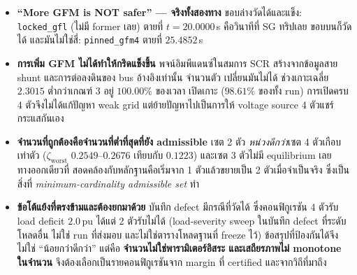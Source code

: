 \documentclass[11pt,a4paper]{article}
\newcommand{\pu}{\,\mathrm{pu}}
\newcommand{\code}[1]{\texttt{\small #1}}
\newcommand{\zworst}{\zeta_{\mathrm{worst}}}
\begin{document}
\begin{itemize}
\item \textbf{``More GFM is NOT safer'' — จริงทั้งสองทาง} ขอบล่างวัดได้และแข็ง:
      \code{locked\_gfl} (ไม่มี former เลย) ตายที่ $t = 20.0000$\,s คือวินาทีที่
      SG ทริปเลย ขอบบนก็วัดได้ และมันไม่ใช่สี่: \code{pinned\_gfm4} ตายที่
      $25.4852$\,s
\item \textbf{การเพิ่ม GFM ไม่ได้ทำให้กริดแข็งขึ้น} พจน์อิมพีแดนซ์ในสมการ SCR
      สร้างจากข้อมูลสาย shunt และการต่อลงดินของ bus อ้างอิงเท่านั้น จำนวนตัว
      เปลี่ยนมันไม่ได้ ช่วงเกาะเฉลี่ย $2.3015$ ต่ำกว่าเกณฑ์ $3$ อยู่ $100.00\%$ ของเวลา
      เปิดเกาะ ($98.61\%$ ของทั้ง run) การเปิดครบ 4 ตัวจึงไม่ได้แก้ปัญหา weak grid
      แต่ย้ายปัญหาไปเป็นการให้ voltage source 4 ตัวแชร์กระแสกันเอง
\item \textbf{จำนวนที่ถูกต้องคือจำนวนที่ต่ำที่สุดที่ยัง admissible} เซต 2 ตัว
      \emph{หน่วงดีกว่า}เซต 4 ตัวเกือบเท่าตัว ($\zworst$ $0.2549$--$0.2676$
      เทียบกับ $0.1223$) และเซต 3 ตัวไม่มี equilibrium เลย ทางออกเดียวที่
      สอดคล้องกับหลักฐานคือเริ่มจาก 1 ตัวแล้วขยายเป็น 2 ตัวเมื่อจำเป็นจริง
      ซึ่งเป็นสิ่งที่ \emph{minimum-cardinality admissible set} ทำ
\item \textbf{ข้อโต้แย้งที่ตรงข้ามและต้องยกมาด้วย} บันทึก defect มีกรณีที่วัดได้
      ซึ่งคอนฟิกูเรชัน 4 ตัวรับ load deficit $2.0\pu$ ได้แต่ 2 ตัวรับไม่ได้
      (load-severity sweep ในบันทึก defect ที่ระดับโหลดอื่น ไม่ใช่ run ที่ส่งมอบ
      และไม่ใช่ตารางโหลดฐานที่ freeze ไว้)
      ข้อสรุปที่ป้องกันได้จึงไม่ใช่ ``น้อยกว่าดีกว่า'' แต่คือ
      \textbf{จำนวนไม่ใช่พารามิเตอร์อิสระ และเสถียรภาพไม่ monotone ในจำนวน}
      จึงต้องเลือกเป็นรายคอนฟิกูเรชันจาก margin ที่ certified และจากวิถีที่มาถึง
\end{itemize}
\end{document}
